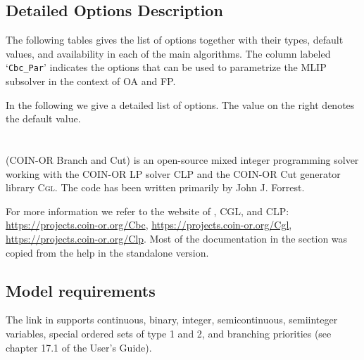 \subsection{Detailed Options Description}
\label{sub:bonminalloptions}

The following tables gives the list of options together with their types, default values, and availability in each of the main algorithms.
The column labeled `\texttt{Cbc\_Par}' indicates the options that can be used to parametrize the MLIP subsolver in the context of OA and FP.



In the following we give a detailed list of \BONMIN options.
The value on the right denotes the default value.


\section{\CBC}
\label{sec:coincbc}
\hypertarget{sec:coincbc}{}


\CBC (COIN-OR Branch and Cut) is an open-source mixed integer programming solver working with the COIN-OR LP solver \textsc{CLP} and the COIN-OR Cut generator library \textsc{Cgl}.
The code has been written primarily by John J. Forrest.

For more information we refer to the website of \CBC, \textsc{CGL}, and \textsc{CLP}: 
\url{https://projects.coin-or.org/Cbc}, \url{https://projects.coin-or.org/Cgl}, \url{https://projects.coin-or.org/Clp}.
Most of the \CBC documentation in the section was copied from the help in the \CBC standalone version.

\subsection{Model requirements}

The \CBC link in \MYGAMS supports continuous, binary, integer, semicontinuous, semiinteger variables, special ordered sets of type 1 and 2, and branching priorities (see chapter 17.1 of the \MYGAMS User's Guide).

